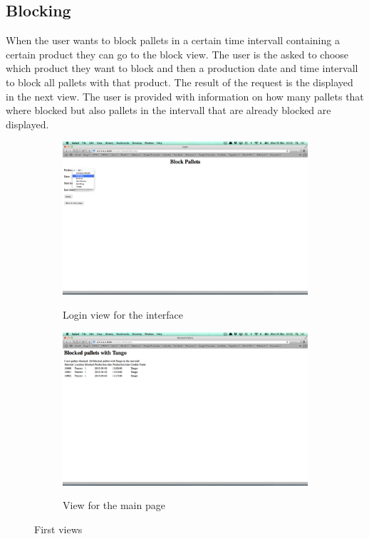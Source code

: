 \documentclass[a4paper]{scrartcl}
\numberwithin{equation}{section}
\begin{document}
\subsection*{Blocking}

When the user wants to block pallets in a certain time intervall containing a certain product they can go to the block view. The user is the asked to choose which product they want to block and then a production date and time intervall to block all pallets with that product. The result of the request is the displayed in the next view. The user is provided with information on how many pallets that where blocked but also pallets in the intervall that are already blocked are displayed.

\begin{figure}[h]
  \centering
  	\begin{subfigure}[b]{0.45\textwidth}
    	\includegraphics[width=\textwidth]{figures/view_block.png}
    	\label{figure:view_block}
    	\caption{Login view for the interface}
 		\end{subfigure}	

 		\begin{subfigure}[b]{0.45\textwidth}
    	\includegraphics[width=\textwidth]{figures/view_blockResult.png}
    	\label{figure:view_blockResult}
    	\caption{View for the main page}
 		\end{subfigure} 
 		\caption{First views}
\end{figure}
\end{document}
